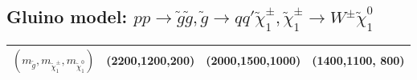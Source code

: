 \documentclass[a4paper,11pt]{article}
\begin{document}
		
	\clearpage	
		\begin{landscape}
	\subsection{Gluino model: $p p \rightarrow \tilde g \tilde g , \tilde g \rightarrow qq'  \tilde \chi _1 ^{\pm} , \tilde \chi _1 ^{\pm} \rightarrow W^{\pm} \tilde \chi _1 ^0$}
		
	
		\begin{table}[h]
			\centering
			\renewcommand\arraystretch{1.0} 
			\scriptsize
			\begin{tabular}{ | l | c c c c  || c c c c || c c c c | } \toprule
				$(m_{\tilde g},m_{\tilde \chi _1 ^{\pm}},m_{\tilde \chi _1 ^0})$ & \multicolumn{4}{c|}{(2200,1200,200)} &	\multicolumn{4}{c}{(2000,1500,1000)} & \multicolumn{4}{c}{(1400,1100, 800)} 
				 \\ \hline 
				

\end{tabular}
\end{table}
\end{landscape}
\end{document}
